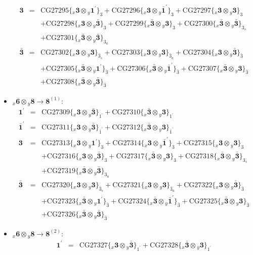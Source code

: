 \documentclass[english]{article}
\newcommand{\rep}[1]{\mathbf{#1}}
\newcommand{\repx}[2]{{}_{#2}\mathbf{#1}}
\newcommand{\subcg}[3]{\big\{ \repx{#1}{x}\otimes\repx{#2}{y}\big\}^{}_{#3}}
\begin{document}
\begin{itemize}
\begin{eqnarray*}
\rep{3} &=& \text{CG27295}\subcg{3}{1^{\prime}}{3}+\text{CG27296}\subcg{3}{\bar{1}^{\prime}}{3}+\text{CG27297}\subcg{3}{3}{3} \\ 
 & & +\text{CG27298}\subcg{3}{\bar{3}}{3}+\text{CG27299}\subcg{\bar{3}}{3}{3}+\text{CG27300}\subcg{\bar{3}}{\bar{3}}{3_{s}} \\ 
 & & +\text{CG27301}\subcg{\bar{3}}{\bar{3}}{3_{a}}
\\
\rep{\bar{3}} &=& \text{CG27302}\subcg{3}{3}{\bar{3}_{s}}+\text{CG27303}\subcg{3}{3}{\bar{3}_{a}}+\text{CG27304}\subcg{3}{\bar{3}}{\bar{3}} \\ 
 & & +\text{CG27305}\subcg{\bar{3}}{1^{\prime}}{\bar{3}}+\text{CG27306}\subcg{\bar{3}}{\bar{1}^{\prime}}{\bar{3}}+\text{CG27307}\subcg{\bar{3}}{3}{\bar{3}} \\ 
 & & +\text{CG27308}\subcg{\bar{3}}{\bar{3}}{\bar{3}}
\end{eqnarray*}
\item $\repx{6}{x}\otimes\repx{8}{y}\to\rep{8}^{(1)}$:
\begin{eqnarray*}
\rep{1^{\prime}} &=& \text{CG27309}\subcg{3}{\bar{3}}{1^{\prime}}+\text{CG27310}\subcg{\bar{3}}{3}{1^{\prime}}
\\
\rep{\bar{1}^{\prime}} &=& \text{CG27311}\subcg{3}{\bar{3}}{\bar{1}^{\prime}}+\text{CG27312}\subcg{\bar{3}}{3}{\bar{1}^{\prime}}
\\
\rep{3} &=& \text{CG27313}\subcg{3}{1^{\prime}}{3}+\text{CG27314}\subcg{3}{\bar{1}^{\prime}}{3}+\text{CG27315}\subcg{3}{3}{3} \\ 
 & & +\text{CG27316}\subcg{3}{\bar{3}}{3}+\text{CG27317}\subcg{\bar{3}}{3}{3}+\text{CG27318}\subcg{\bar{3}}{\bar{3}}{3_{s}} \\ 
 & & +\text{CG27319}\subcg{\bar{3}}{\bar{3}}{3_{a}}
\\
\rep{\bar{3}} &=& \text{CG27320}\subcg{3}{3}{\bar{3}_{s}}+\text{CG27321}\subcg{3}{3}{\bar{3}_{a}}+\text{CG27322}\subcg{3}{\bar{3}}{\bar{3}} \\ 
 & & +\text{CG27323}\subcg{\bar{3}}{1^{\prime}}{\bar{3}}+\text{CG27324}\subcg{\bar{3}}{\bar{1}^{\prime}}{\bar{3}}+\text{CG27325}\subcg{\bar{3}}{3}{\bar{3}} \\ 
 & & +\text{CG27326}\subcg{\bar{3}}{\bar{3}}{\bar{3}}
\end{eqnarray*}
\item $\repx{6}{x}\otimes\repx{8}{y}\to\rep{8}^{(2)}$:
\begin{eqnarray*}
\rep{1^{\prime}} &=& \text{CG27327}\subcg{3}{\bar{3}}{1^{\prime}}+\text{CG27328}\subcg{\bar{3}}{3}{1^{\prime}}
\\

\end{eqnarray*}
\end{itemize}
\end{document}

